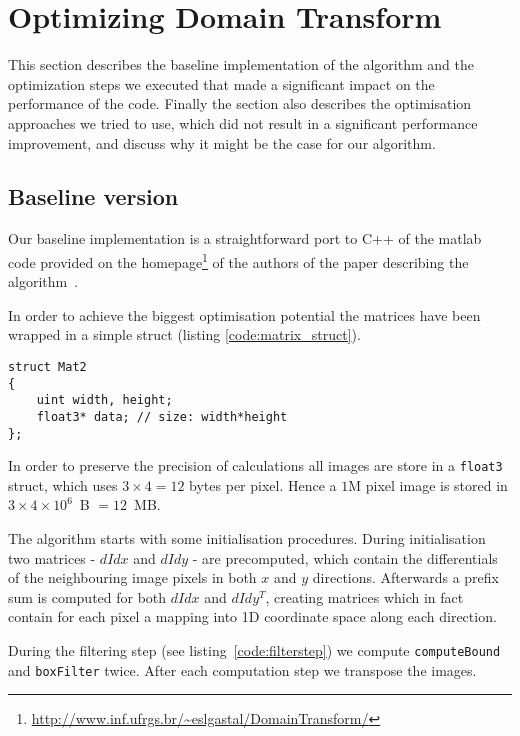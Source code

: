 \section{Optimizing Domain Transform}

This section describes the baseline implementation of the algorithm and the optimization steps we executed that made a significant impact on the performance of the code. Finally the section also describes the optimisation approaches we tried to use, which did not result in a significant performance improvement, and discuss why it might be the case for our algorithm.

\subsection{Baseline version}

Our baseline implementation is a straightforward port to C++ of the matlab code provided on the homepage\footnote{\url{http://www.inf.ufrgs.br/~eslgastal/DomainTransform/}} of the authors of the paper describing the algorithm~\cite{GastalOliveira2011DomainTransform}.

In order to achieve the biggest optimisation potential the matrices have been wrapped in a simple struct (listing \ref{code:matrix_struct}).

\begin{lstlisting}[caption=Matrix struct,label=code:matrix_struct]
struct Mat2
{
    uint width, height;
    float3* data; // size: width*height
};
\end{lstlisting}

In order to preserve the precision of calculations all images are store in a \lstinline{float3} struct, which uses $3\times 4 = 12$ bytes per pixel. Hence a $1$M pixel image is stored in $3\times 4\times 10^6$\ B $=12$\ MB.

The algorithm starts with some initialisation procedures. During initialisation two matrices - $dIdx$ and $dIdy$ - are precomputed, which contain the differentials of the neighbouring image pixels in both $x$ and $y$ directions. Afterwards a prefix sum is computed for both $dIdx$ and $dIdy^T$, creating matrices which in fact contain for each pixel a mapping into 1D coordinate space along each direction.

During the filtering step (see listing~\ref{code:filterstep}) we compute \lstinline{computeBound} and \lstinline{boxFilter} twice. After each computation step we transpose the images.

